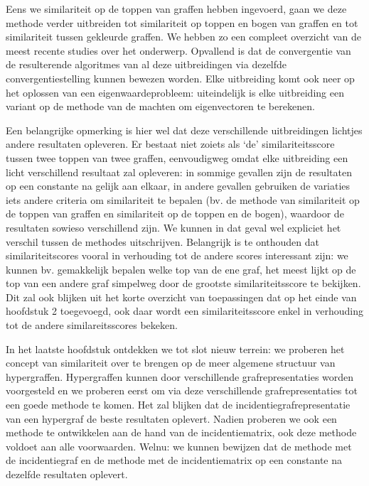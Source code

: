 \documentclass[a4paper,11pt]{report}
\begin{document}
Eens we similariteit op de toppen van graffen hebben ingevoerd, gaan we deze 
methode verder uitbreiden tot similariteit op toppen en bogen van graffen en tot 
similariteit tussen gekleurde graffen. We hebben zo een compleet overzicht van 
de meest recente studies over het onderwerp. Opvallend is dat de convergentie van de resulterende algoritmes van al deze uitbreidingen via 
dezelfde convergentiestelling kunnen bewezen worden. Elke uitbreiding komt ook 
neer op het oplossen van een eigenwaardeprobleem: uiteindelijk is elke 
uitbreiding een variant op de methode van de machten om eigenvectoren te 
berekenen.

Een belangrijke opmerking is hier wel dat deze verschillende uitbreidingen lichtjes 
andere resultaten opleveren. Er bestaat niet zoiets als `de' similariteitsscore tussen twee 
toppen van twee graffen, eenvoudigweg omdat elke uitbreiding een licht verschillend resultaat zal 
opleveren: in sommige gevallen zijn de resultaten op een constante na gelijk aan 
elkaar, in andere gevallen gebruiken de variaties iets andere criteria om 
similariteit te bepalen (bv. de methode van similariteit op de toppen van graffen en similariteit op de toppen en de bogen), waardoor
de resultaten sowieso verschillend zijn. We kunnen in dat geval wel expliciet het verschil tussen de methodes uitschrijven. Belangrijk is te onthouden 
dat similariteitscores vooral in verhouding tot de andere scores interessant zijn: we kunnen 
bv. gemakkelijk bepalen welke top van de ene graf, het meest lijkt op de top van een andere 
graf simpelweg door de grootste similariteitsscore te bekijken.    Dit zal ook blijken uit het korte overzicht van toepassingen dat op 
het einde van hoofdstuk 2 toegevoegd, ook daar wordt een
similariteitsscore enkel in verhouding tot de andere similareitsscores bekeken.

In het laatste hoofdstuk ontdekken we tot slot nieuw terrein: we proberen 
het concept van similariteit over te brengen op de meer algemene 
structuur van hypergraffen. Hypergraffen kunnen door verschillende 
grafrepresentaties worden voorgesteld en we proberen eerst om via deze 
verschillende grafrepresentaties tot een goede methode te komen. Het zal blijken dat de incidentiegrafrepresentatie van een hypergraf de beste
resultaten oplevert. Nadien proberen 
we ook een methode te ontwikkelen aan de hand van de incidentiematrix, ook deze 
methode voldoet aan alle voorwaarden. Welnu: we kunnen bewijzen dat de methode 
met de incidentiegraf en de methode met de incidentiematrix op een constante na 
dezelfde resultaten oplevert.
\end{document}
